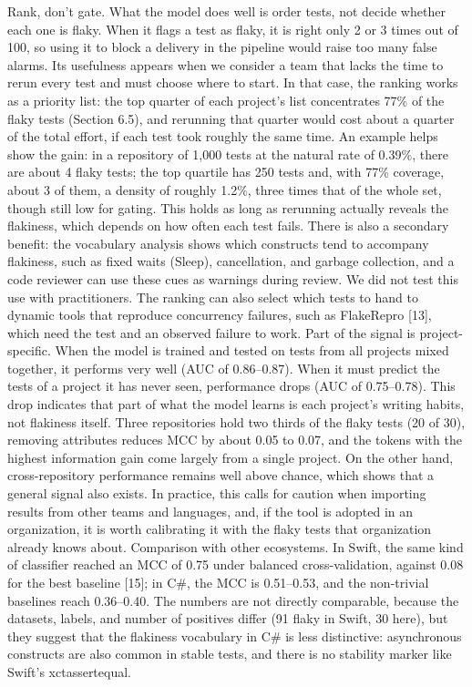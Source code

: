 Rank, don't gate. What the model does well is order tests, not decide whether each one is flaky. When it flags a test as flaky, it is right only 2 or 3 times out of 100, so using it to block a delivery in the pipeline would raise too many false alarms. Its usefulness appears when we consider a team that lacks the time to rerun every test and must choose where to start. In that case, the ranking works as a priority list: the top quarter of each project's list concentrates 77\% of the flaky tests (Section 6.5), and rerunning that quarter would cost about a quarter of the total effort, if each test took roughly the same time. An example helps show the gain: in a repository of 1,000 tests at the natural rate of 0.39\%, there are about 4 flaky tests; the top quartile has 250 tests and, with 77\% coverage, about 3 of them, a density of roughly 1.2\%, three times that of the whole set, though still low for gating. This holds as long as rerunning actually reveals the flakiness, which depends on how often each test fails. There is also a secondary benefit: the vocabulary analysis shows which constructs tend to accompany flakiness, such as fixed waits (Sleep), cancellation, and garbage collection, and a code reviewer can use these cues as warnings during review. We did not test this use with practitioners. The ranking can also select which tests to hand to dynamic tools that reproduce concurrency failures, such as FlakeRepro [13], which need the test and an observed failure to work.
Part of the signal is project-specific. When the model is trained and tested on tests from all projects mixed together, it performs very well (AUC of 0.86--0.87). When it must predict the tests of a project it has never seen, performance drops (AUC of 0.75--0.78). This drop indicates that part of what the model learns is each project's writing habits, not flakiness itself. Three repositories hold two thirds of the flaky tests (20 of 30), removing attributes reduces MCC by about 0.05 to 0.07, and the tokens with the highest information gain come largely from a single project. On the other hand, cross-repository performance remains well above chance, which shows that a general signal also exists. In practice, this calls for caution when importing results from other teams and languages, and, if the tool is adopted in an organization, it is worth calibrating it with the flaky tests that organization already knows about.
Comparison with other ecosystems. In Swift, the same kind of classifier reached an MCC of 0.75 under balanced cross-validation, against 0.08 for the best baseline [15]; in C\#, the MCC is 0.51--0.53, and the non-trivial baselines reach 0.36--0.40. The numbers are not directly comparable, because the datasets, labels, and number of positives differ (91 flaky in Swift, 30 here), but they suggest that the flakiness vocabulary in C\# is less distinctive: asynchronous constructs are also common in stable tests, and there is no stability marker like Swift's xctassertequal.
